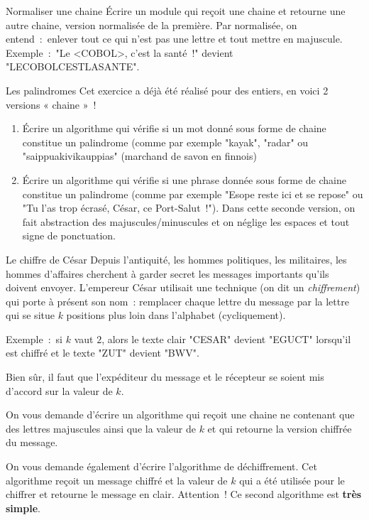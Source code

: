 	\begin{Exercice}{Normaliser une chaine}
		Écrire un module qui reçoit une chaine et retourne une autre chaine,
		version normalisée de la première.
		Par normalisée, on entend~:~enlever tout ce qui n’est pas une lettre 
		et tout mettre en majuscule.
		\\Exemple~:~"Le <COBOL>, c’est la santé~!" devient "LECOBOLCESTLASANTE".
	\end{Exercice}
		
	\begin{Exercice}{Les palindromes}
		Cet exercice a déjà été réalisé pour des entiers, 
		en voici 2 versions « chaine »~! 
		\begin{enumerate}[label=\alph*)]
		\item 
			Écrire un algorithme qui vérifie 
			si un mot donné sous forme de chaine 
			constitue un palindrome 
			(comme par exemple "kayak", "radar" ou "saippuakivikauppias" 
			(marchand de savon en finnois)
		\item
			Écrire un algorithme qui vérifie 
			si une phrase donnée sous forme de chaine constitue un palindrome 
			(comme par exemple "Esope reste ici et se repose" 
			ou "Tu l’as trop écrasé, César, ce Port-Salut~!"). 
			Dans cette seconde version, 
			on fait abstraction des majuscules/minuscules 
			et on néglige les espaces et tout signe de ponctuation.
		\end{enumerate}
	\end{Exercice}
	
	\begin{Exercice}{Le chiffre de César}
		\label{ex:cesar}
		Depuis l’antiquité, les hommes politiques, les militaires, 
		les hommes d’affaires cherchent à garder secret les messages
		importants qu’ils doivent envoyer.
		L’empereur César utilisait une technique (on dit un \emph{chiffrement})
		qui porte à présent son nom~:
		remplacer chaque lettre du message par la lettre qui se situe 
		$k$ positions plus loin dans l’alphabet (cycliquement).
		
		Exemple~:~si $k$ vaut $2$, 
		alors le texte clair "CESAR" devient "EGUCT" lorsqu’il est chiffré 
		et le texte "ZUT" devient "BWV".
		
		Bien sûr, il faut que l’expéditeur du message et le récepteur
		se soient mis d’accord sur la valeur de $k$.
		
		On vous demande d’écrire un algorithme qui reçoit une chaine ne contenant
		que des lettres majuscules ainsi que la valeur de $k$ et qui retourne
		la version chiffrée du message.
	
		On vous demande également d’écrire l’algorithme de déchiffrement.
		Cet algorithme reçoit un message chiffré et la valeur de $k$ qui a été
		utilisée pour le chiffrer et retourne le message en clair.
		Attention~! Ce second algorithme est \textbf{très simple}.
	\end{Exercice}

